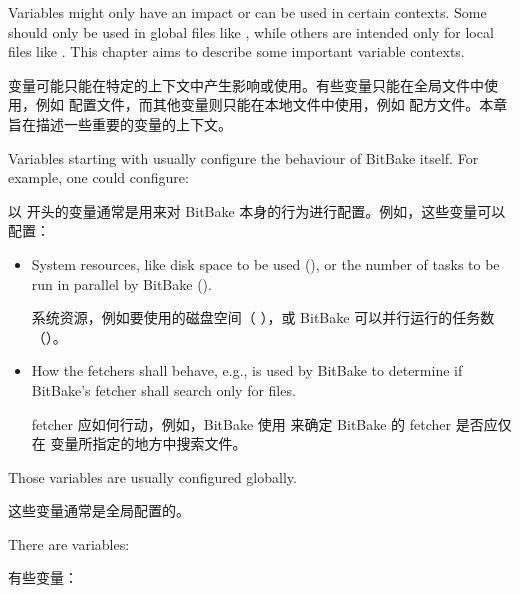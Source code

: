 
Variables might only have an impact or can be used in certain contexts. Some should only be used in global files like , while others are intended only for local files like . This chapter aims to describe some important variable contexts.

变量可能只能在特定的上下文中产生影响或使用。有些变量只能在全局文件中使用，例如  配置文件，而其他变量则只能在本地文件中使用，例如  配方文件。本章旨在描述一些重要的变量的上下文。

Variables starting with  usually configure the behaviour of BitBake itself. For example, one could configure:

以  开头的变量通常是用来对 BitBake 本身的行为进行配置。例如，这些变量可以配置：

\begin{itemize}
\setlength\itemsep{1.0em}
\item System resources, like disk space to be used (), or the number of tasks to be run in parallel by BitBake ().

\medskip
系统资源，例如要使用的磁盘空间（ ），或 BitBake 可以并行运行的任务数\linebreak（）。

\item How the fetchers shall behave, e.g.,  is used by BitBake to determine if BitBake's fetcher shall search only  for files.

\medskip
fetcher 应如何行动，例如，BitBake 使用  来确定 BitBake 的 fetcher 是否应仅在  变量所指定的地方中搜索文件。
\end{itemize}

Those variables are usually configured globally.

这些变量通常是全局配置的。

There are variables:

有些变量：

